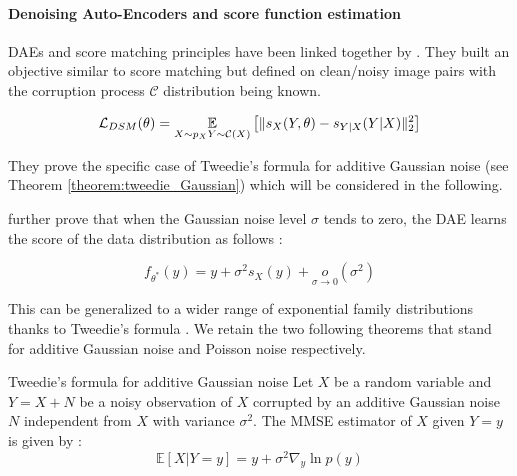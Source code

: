 \paragraph{Denoising Auto-Encoders and score function estimation}




DAEs and score matching principles have been linked together by \cite{vincent_connection_2011}. They built an objective similar to score matching but defined on clean/noisy image pairs with the corruption process $\mathcal{C}$ distribution being known.

\begin{equation}
    \mathcal{L}_{DSM}(\theta) = \underset{X \sim p_X \\ Y \sim \mathcal{C}(X)}{\mathbb{E}} \left[ \| s_X(Y, \theta) - s_{Y|X}(Y|X) \|_2^2 \right]
\end{equation}

They prove the specific case of Tweedie's formula for additive Gaussian noise (see Theorem \ref{theorem:tweedie_Gaussian}) which will be considered in the following.

\cite{alain_what_2014} further prove that when the Gaussian noise level $\sigma$ tends to zero, the DAE learns the score of the data distribution as follows :

\begin{equation}
    f_{\theta^*}(y) = y + \sigma^2 s_X(y) + \underset{\sigma \to 0}{o}(\sigma^2)
\end{equation}

This can be generalized to a wider range of exponential family distributions thanks to Tweedie's formula \cite{efron_tweedies_2011}. We retain the two following theorems that stand for additive Gaussian noise and Poisson noise respectively.

\begin{theorem}{Tweedie's formula for additive Gaussian noise}
    \label{theorem:tweedie_Gaussian}
    Let $X$ be a random variable and $Y = X + N$ be a noisy observation of $X$ corrupted by an additive Gaussian noise $N$ independent from $X$ with variance $\sigma^2$. The MMSE estimator of $X$ given $Y = y$ is given by :
    \begin{equation}
        \mathbb{E}\left[X | Y = y\right] = y + \sigma^2 \nabla_y \ln p(y)
    \end{equation}
\end{theorem}


